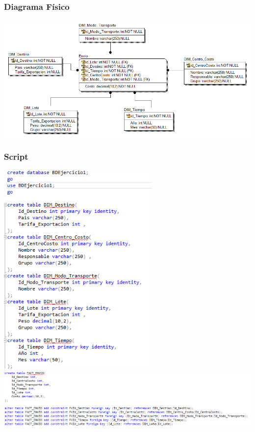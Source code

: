 \begin{itemize}
   \subsubsection{Diagrama Físico }
	
	\begin{center}
	\includegraphics[width=14cm]{./Imagenes/ejercicio1_fisico}
	\end{center}

 \subsubsection{Script }
\begin{center}
	\includegraphics[width=8cm]{./Imagenes/ej1_script1}
	\includegraphics[width=14cm]{./Imagenes/ej1_script2}
	\end{center}



\end{itemize}
